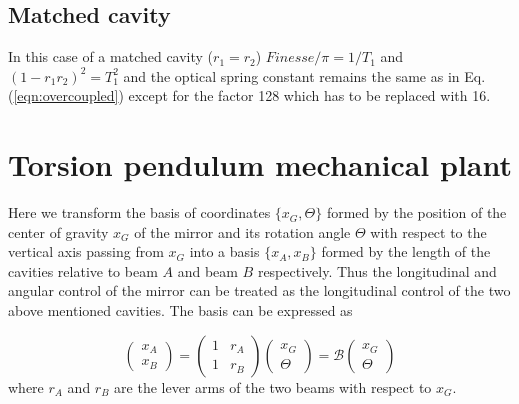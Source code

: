 \subsection{Matched cavity}

In this case of a matched cavity ($r_1=r_2$) $Finesse/\pi=1/T_1$ and $(1-r_1r_2)^2=T_1^2$ and the optical spring constant remains the same as in Eq. (\ref{eqn:overcoupled}) except for the factor 128 which has to be replaced with 16.



\section{Torsion pendulum mechanical plant}
\label{app:B} 

Here we transform
the basis of coordinates $\{x_G,\Theta\}$  formed by the position of the center of gravity $x_G$ of the mirror and its rotation angle $\Theta$  with respect to the vertical axis passing from $x_G$ into a basis $\{x_A,x_B\}$ formed by the length of the cavities relative to beam $A$ and beam $B$ respectively. Thus the longitudinal and angular control of the mirror can be treated as the longitudinal control of the two above mentioned cavities. The basis can be expressed as
%

\begin{equation}
\label{eqn:BDEF}
\begin{pmatrix}
x_A \\ x_B
\end{pmatrix}
=
 \begin{pmatrix}
1& r_A\\1& r_B
\end{pmatrix} 
\begin{pmatrix}
x_G\\ \Theta
\end{pmatrix}
=
\mathcal{B}
\begin{pmatrix}
x_G\\ \Theta
\end{pmatrix}
\end{equation}
where $r_A$ and $r_B$ are the lever arms of the two beams with respect to $x_G$.

